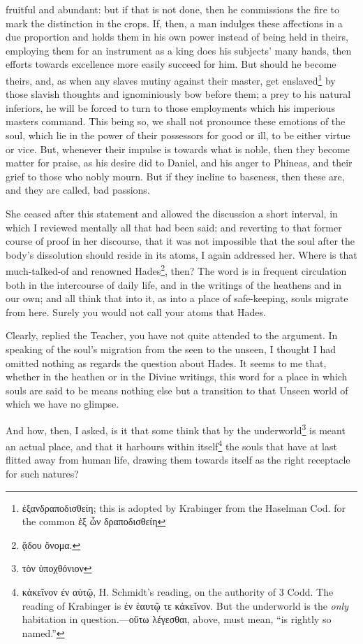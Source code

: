 fruitful and abundant: but if that is not done, then he commissions the fire to mark the distinction in the crops. If, then, a man indulges these affections in a due proportion and holds them in his own power instead of being held in theirs, employing them for an instrument as a king does his subjects’ many hands, then efforts towards excellence more easily succeed for him. But should he become theirs, and, as when any slaves mutiny against their master, get enslaved\footnote{\textgreek{ἐξανδραποδισθείη}; this is adopted by Krabinger from the Haselman Cod. for the common \textgreek{ἐξ ὧν δραποδισθείη}} by those slavish thoughts and ignominiously bow before them; a prey to his natural inferiors, he will be forced to turn to those employments which his imperious masters command. This being so, we shall not pronounce these emotions of the soul, which lie in the power of their possessors for good or ill, to be either virtue or vice. But, whenever their impulse is towards what is noble, then they become matter for praise, as his desire did to Daniel, and his anger to Phineas, and their grief to those who nobly mourn. But if they incline to baseness, then these are, and they are called, bad passions.

She ceased after this statement and allowed the discussion a short interval, in which I reviewed mentally all that had been said; and reverting to that former course of proof in her discourse, that it was not impossible that the soul after the body’s dissolution should reside in its atoms, I again addressed her. Where is that much-talked-of and renowned Hades\footnote{\textgreek{ᾅδου ὄνομα}.}, then? The word is in frequent circulation both in the intercourse of daily life, and in the writings of the heathens and in our own; and all think that into it, as into a place of safe-keeping, souls migrate from here. Surely you would not call your atoms that Hades.

Clearly, replied the Teacher, you have not quite attended to the argument. In speaking of the soul’s migration from the seen to the unseen, I thought I had omitted nothing as regards the question about Hades. It seems to me that, whether in the heathen or in the Divine writings, this word for a place in which souls are said to be means nothing else but a transition to that Unseen world of which we have no glimpse.

And how, then, I asked, is it that some think that by the underworld\footnote{\textgreek{τὸν ὑποχθόνιον}} is meant an actual place, and that it harbours within itself\footnote{\textgreek{κἀκεῖνον ἐν αὑτῷ}, H. Schmidt’s reading, on the authority of 3 Codd. The reading of Krabinger is \textgreek{ἐν ἑαυτῷ τε κἀκεῖνον}. But the underworld is the \emph{only} habitation in question.—\textgreek{οὕτω λέγεσθαι}, above, must mean, “is rightly so named.”} the souls that have at last flitted away from human life, drawing them towards itself as the right receptacle for such natures?

